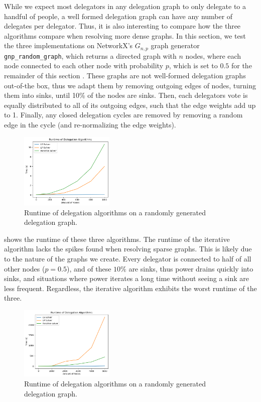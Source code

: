 While we expect most delegators in any delegation graph to only delegate to a handful of people, a well formed delegation graph can have any number of delegates per delegator. Thus, it is also interesting to compare how the three algorithms compare when resolving more dense graphs. In this section, we test the three implementations on NetworkX's $G_{n,p}$ graph generator \texttt{gnp\_random\_graph}, which returns a directed graph with $n$ nodes, where each node connected to each other node with probability $p$, which is set to $0.5$ for the remainder of this section \cite{hagbergExploringNetworkStructure2008hagbergExploringNetworkStructure2008}. These graphs are not well-formed delegation graphs out-of-the box, thus we adapt them by removing outgoing edges of nodes, turning them into sinks, until 10\% of the nodes are sinks. Then, each delegators vote is equally distributed to all of its outgoing edges, such that the edge weights add up to 1. Finally, any closed delegation cycles are removed by removing a random edge in the cycle (and re-normalizing the edge weights). 

\begin{figure}[h]
    \centering
    \includegraphics[width=0.4\textwidth]{0-1000_dense}
    \caption{Runtime of delegation algorithms on a randomly generated delegation graph.}
    \label{fig:dense-small}
\end{figure}

 shows the runtime of these three algorithms. The runtime of the iterative algorithm lacks the spikes found when resolving sparse graphs. This is likely due to the nature of the graphs we create. Every delegator is connected to half of all other nodes ($p = 0.5$), and of these $10\%$ are sinks, thus power drains quickly into sinks, and situations where power iterates a long time without seeing a sink are less frequent. Regardless, the iterative algorithm exhibits the worst runtime of the three. 

\begin{figure}[h]
    \centering
    \includegraphics[width=0.4\textwidth]{0-5000_dense}
    \caption{Runtime of delegation algorithms on a randomly generated delegation graph.}
    \label{fig:dense-large}
\end{figure}

